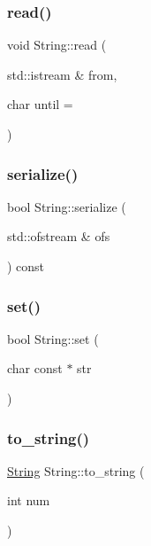 \mbox{\label{classString_ab0c13e38cf91f55bb6eaedd513f124db}} 
\subsubsection{\texorpdfstring{read()}{read()}}
{\footnotesize\ttfamily void String\+::read (\begin{DoxyParamCaption}\item[{std\+::istream \&}]{from,  }\item[{char}]{until = {\ttfamily \textquotesingle{}~\textquotesingle{}} }\end{DoxyParamCaption})}

\mbox{\label{classString_a05ec329796015f98719b6a924c0f0eb4}} 
\subsubsection{\texorpdfstring{serialize()}{serialize()}}
{\footnotesize\ttfamily bool String\+::serialize (\begin{DoxyParamCaption}\item[{std\+::ofstream \&}]{ofs }\end{DoxyParamCaption}) const}

\mbox{\label{classString_a809addfc91485db4c89baad03ff12b18}} 
\subsubsection{\texorpdfstring{set()}{set()}}
{\footnotesize\ttfamily bool String\+::set (\begin{DoxyParamCaption}\item[{char const $\ast$}]{str }\end{DoxyParamCaption})}

\mbox{\label{classString_a52f9352ece5a5266018539183b0de85c}} 
\subsubsection{\texorpdfstring{to\+\_\+string()}{to\_string()}}
{\footnotesize\ttfamily \hyperlink{classString}{String} String\+::to\+\_\+string (\begin{DoxyParamCaption}\item[{int}]{num }\end{DoxyParamCaption})\hspace{0.3cm}{\ttfamily [static]}}

